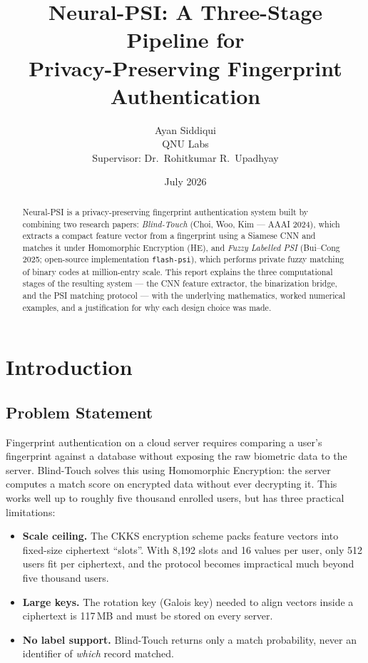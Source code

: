 \documentclass[11pt]{article}
\title{\textbf{Neural-PSI: A Three-Stage Pipeline for\\
Privacy-Preserving Fingerprint Authentication}}
\author{Ayan Siddiqui \\ QNU Labs \\ Supervisor: Dr.\ Rohitkumar R.\ Upadhyay}
\date{July 2026}
\begin{document}
\maketitle

\begin{abstract}
\noindent
Neural-PSI is a privacy-preserving fingerprint authentication system built by combining
two research papers: \emph{Blind-Touch} (Choi, Woo, Kim --- AAAI 2024), which extracts a
compact feature vector from a fingerprint using a Siamese CNN and matches it under
Homomorphic Encryption (HE), and \emph{Fuzzy Labelled PSI} (Bui--Cong 2025; open-source
implementation \texttt{flash-psi}), which performs private fuzzy matching of binary codes at
million-entry scale. This report explains the
three computational stages of the resulting system --- the CNN feature extractor, the
binarization bridge, and the PSI matching protocol --- with the underlying mathematics,
worked numerical examples, and a justification for why each design choice was made.
\end{abstract}

\section{Introduction}

\subsection{Problem Statement}

Fingerprint authentication on a cloud server requires comparing a user's fingerprint
against a database without exposing the raw biometric data to the server. Blind-Touch
solves this using Homomorphic Encryption: the server computes a match score on encrypted
data without ever decrypting it. This works well up to roughly five thousand enrolled
users, but has three practical limitations:

\begin{itemize}[noitemsep]
  \item \textbf{Scale ceiling.} The CKKS encryption scheme packs feature vectors into
        fixed-size ciphertext ``slots''. With 8{,}192 slots and 16 values per user, only
        512 users fit per ciphertext, and the protocol becomes impractical much beyond
        five thousand users.
  \item \textbf{Large keys.} The rotation key (Galois key) needed to align vectors inside
        a ciphertext is 117\,MB and must be stored on every server.
  \item \textbf{No label support.} Blind-Touch returns only a match probability, never an
        identifier of \emph{which} record matched.
\end{itemize}
\end{document}
